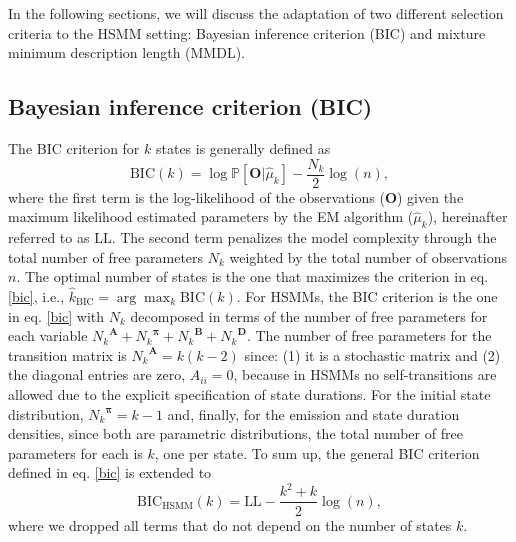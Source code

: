 \documentclass[extendedabs]{recpad2k}
\begin{document}
In the following sections, we will discuss the adaptation of two different selection criteria to the HSMM setting: Bayesian inference criterion (BIC) and mixture minimum description length (MMDL).
\subsection{Bayesian inference criterion (BIC)}
The BIC criterion for $k$ states is generally defined as
\begin{equation}
    \text{BIC}(k) = \log \mathbb{P}[\textbf{O}|\hat{\mu}_k]-\dfrac{N_k}{2}\log(n),
    \label{bic}
\end{equation}
where the first term is the log-likelihood of the observations ($\textbf{O}$) given the maximum likelihood estimated parameters by the EM algorithm ($\hat{\mu}_k$), hereinafter referred to as $\text{LL}$. The second term penalizes the model complexity through the total number of free parameters $N_k$ weighted by the total number of observations $n$. %
The optimal number of states is the one that maximizes the criterion in eq. \eqref{bic}, i.e., $\hat{k}_{\text{BIC}} = \arg \max_k \text{BIC}(k)$. For HSMMs, the BIC criterion is the one in eq. \eqref{bic} with $N_k$ decomposed in terms of the number of free parameters for each variable ${N_k}^{\boldsymbol{A}}+{N_k}^{\boldsymbol{\pi}}+{N_k}^{\boldsymbol{B}}+{N_k}^{\boldsymbol{D}}$. The number of free parameters for the transition matrix is ${N_k}^{\boldsymbol{A}}=k(k-2)$ since: (1) it is a stochastic matrix %
and (2) the diagonal entries are zero, $A_{ii}=0$, because in HSMMs no self-transitions are allowed due to the explicit specification of state durations. For the initial state distribution, ${N_k}^{\boldsymbol{\pi}}=k-1$ and, finally, for the emission and state duration densities, since both are parametric distributions, the total number of free parameters for each is $k$, one per state. To sum up, the general BIC criterion defined in eq. \eqref{bic} is extended to
\begin{equation}
    \text{BIC}_{\text{HSMM}}(k) = \text{LL}-\dfrac{k^2+k}{2}\log(n),
    \label{bic_hsmm}
\end{equation}
where we dropped all terms that do not depend on the number of states $k$.
\end{document}
